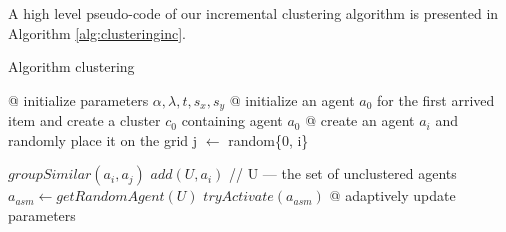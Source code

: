 A high level pseudo-code of our incremental clustering algorithm is presented in Algorithm \ref{alg:clusteringinc}.
 

\begin{algorithm}
\caption{Algorithm clustering}
\label{alg:clusteringinc}
\begin{algorithmic}[1]

\STATE @ initialize parameters \begin{math}   \alpha, \lambda, t, s_x, s_y   \end{math}
\STATE @  initialize an agent $a_0$ for the first arrived item and create a cluster $c_0$ containing agent $a_0$
	\STATE @ create an agent $a_i$ and randomly place it on the grid
	\STATE  j $\leftarrow$ random\{0, i\}

	\STATE  $groupSimilar(a_i, a_j)$
	\ELSE 
	\STATE  $add(U, a_i)$	// U --- the set of unclustered agents
	\ENDIF
	\STATE   	$a_{asm} \leftarrow getRandomAgent(U)$
	\STATE  $tryActivate(a_{asm})$
	\ENDIF
	\ENDFOR
	\STATE @ adaptively update parameters
	\ENDWHILE

\end{algorithmic}
\end{algorithm}

